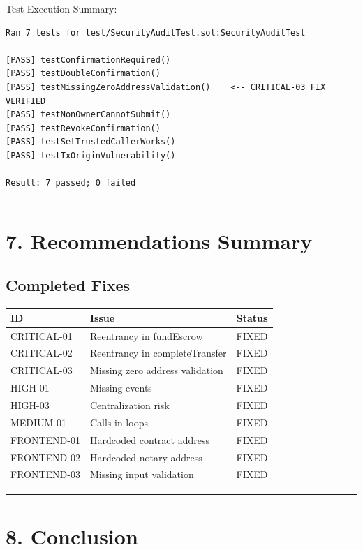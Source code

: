 \documentclass[12pt,a4paper]{article}
\begin{document}
\bigskip
Test Execution Summary:

\begin{verbatim}
Ran 7 tests for test/SecurityAuditTest.sol:SecurityAuditTest

[PASS] testConfirmationRequired()
[PASS] testDoubleConfirmation()
[PASS] testMissingZeroAddressValidation()    <-- CRITICAL-03 FIX VERIFIED
[PASS] testNonOwnerCannotSubmit()
[PASS] testRevokeConfirmation()
[PASS] testSetTrustedCallerWorks()
[PASS] testTxOriginVulnerability()

Result: 7 passed; 0 failed
\end{verbatim}

\bigskip
\hrule

\section*{7. Recommendations Summary}

\subsection*{Completed Fixes}

\begin{table}[h]
\centering
\begin{tabular}{llc}
\toprule
\textbf{ID} & \textbf{Issue} & \textbf{Status} \\
\midrule
CRITICAL-01 & Reentrancy in fundEscrow & FIXED \\
CRITICAL-02 & Reentrancy in completeTransfer & FIXED \\
CRITICAL-03 & Missing zero address validation & FIXED \\
HIGH-01 & Missing events & FIXED \\
HIGH-03 & Centralization risk & FIXED \\
MEDIUM-01 & Calls in loops & FIXED \\
FRONTEND-01 & Hardcoded contract address & FIXED \\
FRONTEND-02 & Hardcoded notary address & FIXED \\
FRONTEND-03 & Missing input validation & FIXED \\
\bottomrule
\end{tabular}
\end{table}

\bigskip
\hrule

\section*{8. Conclusion}
\end{document}
